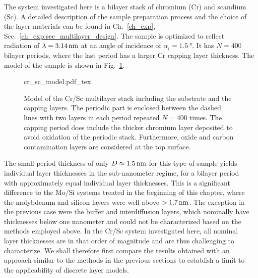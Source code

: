 The system investigated here is a bilayer stack of chromium (Cr) and scandium (Sc). A detailed description of the sample preparation process and the choice of the layer materials can be found in Ch.~\ref{ch_exp}, Sec.~\ref{ch_exp:sec_multilayer_design}. The sample is optimized to reflect radiation of $\lambda = \nm{3.14}$ at an angle of incidence of $\alpha_i = \SI{1.5}{\degree}$. It has $N=400$ bilayer periods, where the last period has a larger Cr capping layer thickness. The model of the sample is shown in Fig.~\ref{ch_spec:fig_Cr_Sc_model}.
\begin{figure}[htbp]
    \def\svgwidth{0.7\textwidth}
    \selectfont\footnotesize
    {cr_sc_model.pdf_tex}
    \caption[Model of the Cr/Sc multilayer stack including the substrate and the capping layers.]{Model of the Cr/Sc multilayer stack including the substrate and the capping layers. The periodic part is enclosed between the dashed lines with two layers in each period repeated $N=400$ times. The capping period does include the thicker chromium layer deposited to avoid oxidation of the periodic stack. Furthermore, oxide and carbon contamination layers are considered at the top surface.}
    \label{ch_spec:fig_Cr_Sc_model}
\end{figure}
The small period thickness of only $D\approx\nm{1.5}$ for this type of sample yields individual layer thicknesses in the sub-nanometer regime, for a bilayer period with approximately equal individual layer thicknesses. This is a significant difference to the Mo/Si systems treated in the beginning of this chapter, where the molybdenum and silicon layers were well above $>\nm{1.7}$. The exception in the previous case were the buffer and interdiffusion layers, which nominally have thicknesses below one nanometer and could not be characterized based on the methods employed above. In the Cr/Sc system investigated here, all nominal layer thicknesses are in that order of magnitude and are thus challenging to characterize. We shall therefore first compare the results obtained with an approach similar to the methods in the previous sections to establish a limit to the applicability of discrete layer models.

